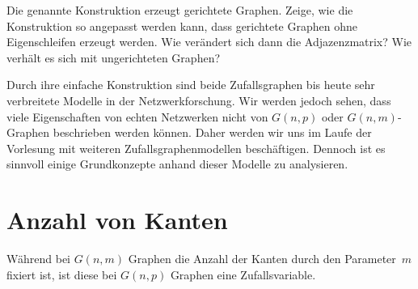 \begin{center}

\end{center}

\begin{exercise}
    Die genannte Konstruktion erzeugt gerichtete Graphen.
    Zeige, wie die Konstruktion so angepasst werden kann, dass gerichtete Graphen ohne Eigenschleifen erzeugt werden.
    Wie verändert sich dann die Adjazenzmatrix?
    Wie verhält es sich mit ungerichteten Graphen?
\end{exercise}

Durch ihre einfache Konstruktion sind beide Zufallsgraphen bis heute sehr verbreitete Modelle in der Netzwerkforschung.
Wir werden jedoch sehen, dass viele Eigenschaften von echten Netzwerken nicht von $G(n,p)$ oder $G(n,m)$-Graphen beschrieben werden können.
Daher werden wir uns im Laufe der Vorlesung mit weiteren Zufallsgraphenmodellen beschäftigen.
Dennoch ist es sinnvoll einige Grundkonzepte anhand dieser Modelle zu analysieren.

\section{Anzahl von Kanten}
Während bei $G(n,m)$ Graphen die Anzahl der Kanten durch den Parameter~$m$ fixiert ist, ist diese bei $G(n,p)$ Graphen eine Zufallsvariable.

